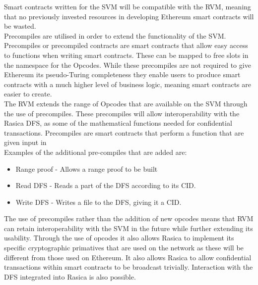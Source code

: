 Smart contracts written for the SVM will be compatible with the RVM, meaning that no previously invested resources in developing Ethereum smart contracts will be wasted.  \\

Precompiles are utilised in order to extend the functionality of the SVM. Precompiles or precompiled contracts are smart contracts that allow easy access to functions when writing smart contracts. These can be mapped to free slots in the namespace for the Opcodes. While these precompiles are not required to give Ethereum its pseudo-Turing completeness they enable users to produce smart contracts with a much higher level of business logic, meaning smart contracts are easier to create. \\

The RVM extends the range of Opcodes that are available on the SVM through the use of precompiles. These precompiles will allow interoperability with the Rasica DFS, as some of the mathematical functions needed for confidential transactions. Precompiles are smart contracts that perform a function that are given input in\\

Examples of the additional pre-compiles that are added are: \\

\begin{itemize} 
\item Range proof - Allows a range proof to be built 
\item Read DFS - Reads a part of the DFS according to its CID.
\item Write DFS - Writes a file to the DFS, giving it a CID. \\
\end{itemize} 

The use of precompiles rather than the addition of new opcodes means that RVM can retain interoperability with the SVM in the future while further extending its usability. Through the use of opcodes it also allows Rasica to implement its specific cryptographic primatives that are used on the network as these will be different from those used on Ethereum. It also allows Rasica to allow confidential transactions within smart contracts to be broadcast trivially. Interaction with the DFS integrated into Rasica is also possible. 